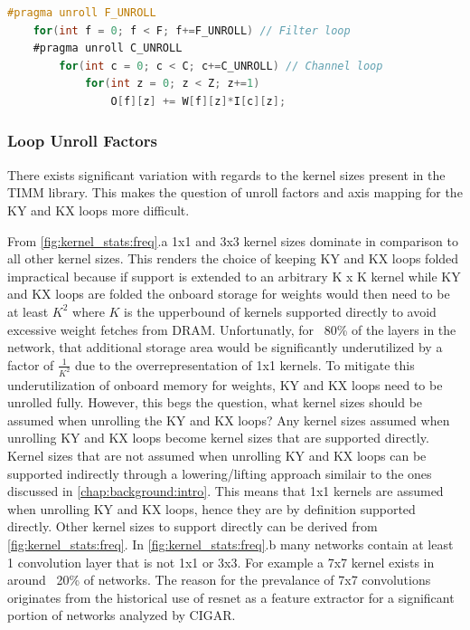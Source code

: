 \begin{lstlisting}[language=C, caption=GEMM loops, label={lst:W_S_Generic_Loop}]
    #pragma unroll F_UNROLL
    for(int f = 0; f < F; f+=F_UNROLL) // Filter loop
    #pragma unroll C_UNROLL
        for(int c = 0; c < C; c+=C_UNROLL) // Channel loop
            for(int z = 0; z < Z; z+=1)
                O[f][z] += W[f][z]*I[c][z];
\end{lstlisting}

\subsubsection{Loop Unroll Factors}
\label{chap:dataflow_dse:pruning:applying_it:loop_unroll_factors}

There exists significant variation with regards to the kernel sizes present in
the TIMM library. This makes the question of unroll factors and axis mapping for
the KY and KX loops more difficult.

From \autoref{fig:kernel_stats:freq}.a 1x1 and 3x3 kernel sizes dominate in
comparison to all other kernel sizes. This renders the choice of keeping KY and
KX loops folded impractical because if support is extended to an arbitrary K x K
kernel while KY and KX loops are folded the onboard storage for weights would
then need to be at least $K^2$ where $K$ is the upperbound of kernels supported
directly to avoid excessive weight fetches from DRAM. Unfortunatly, for ~80\% of
the layers in the network, that additional storage area would be significantly
underutilized by a factor of $\frac{1}{K^2}$ due to the overrepresentation of
1x1 kernels. To mitigate this underutilization of onboard memory for weights, KY
and KX loops need to be unrolled fully. However, this begs the question, what
kernel sizes should be assumed when unrolling the KY and KX loops? Any kernel
sizes assumed when unrolling KY and KX loops become kernel sizes that are
supported directly. Kernel sizes that are not assumed when unrolling KY and KX
loops can be supported indirectly through a lowering/lifting approach similair
to the ones discussed in \autoref{chap:background:intro}. This means that 1x1 kernels are assumed when
unrolling KY and KX loops, hence they are by definition supported directly.
Other kernel sizes to support directly can be derived from
\autoref{fig:kernel_stats:freq}. In \autoref{fig:kernel_stats:freq}.b many networks contain at least 1 convolution
layer that is not 1x1 or 3x3. For example a 7x7 kernel exists in around ~20\% of
networks. The reason for the prevalance of 7x7 convolutions originates from the
historical use of resnet \cite{resnet} as a feature extractor for a significant
portion of networks analyzed by CIGAR.

